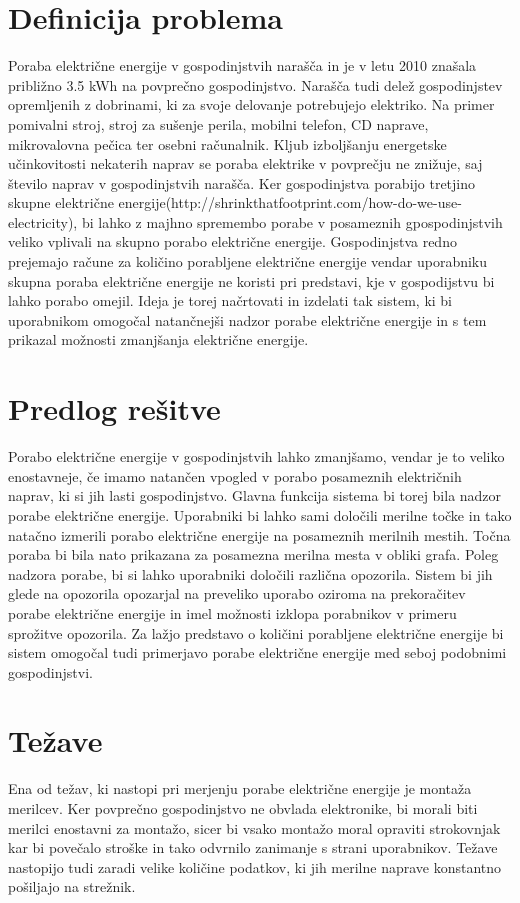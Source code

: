 \documentclass[12pt,a4paper,titlepage,openany]{report}
\begin{document}
\section{Definicija problema}
\thispagestyle{fancy}
Poraba električne energije v gospodinjstvih narašča in je v letu 2010 znašala približno 3.5 kWh na povprečno gospodinjstvo. Narašča tudi delež gospodinjstev opremljenih z dobrinami, ki za svoje delovanje potrebujejo elektriko. Na primer pomivalni stroj, stroj za sušenje perila, mobilni telefon, CD naprave, mikrovalovna pečica ter osebni računalnik. Kljub izboljšanju energetske učinkovitosti nekaterih naprav se poraba elektrike v povprečju ne znižuje, saj število naprav v gospodinjstvih narašča. Ker gospodinjstva porabijo tretjino skupne električne energije(http://shrinkthatfootprint.com/how-do-we-use-electricity), bi lahko z majhno spremembo porabe v posameznih gpospodinjstvih veliko vplivali na skupno porabo električne energije. Gospodinjstva redno prejemajo račune za količino porabljene električne energije vendar uporabniku skupna poraba električne energije ne koristi pri predstavi, kje v gospodijstvu bi lahko porabo omejil. Ideja je torej načrtovati in izdelati tak sistem, ki bi uporabnikom omogočal natančnejši nadzor porabe električne energije in s tem prikazal možnosti zmanjšanja električne energije.

\section{Predlog rešitve}
\thispagestyle{fancy}
Porabo električne energije v gospodinjstvih lahko zmanjšamo, vendar je to veliko enostavneje, če imamo natančen vpogled v porabo posameznih električnih naprav, ki si jih lasti gospodinjstvo. Glavna funkcija sistema bi torej bila nadzor porabe električne energije. Uporabniki bi lahko sami določili merilne točke in tako natačno izmerili porabo električne energije na posameznih merilnih mestih. Točna poraba bi bila nato prikazana za posamezna merilna mesta v obliki grafa. Poleg nadzora porabe, bi si lahko uporabniki določili različna opozorila. Sistem bi jih glede na opozorila opozarjal na preveliko uporabo oziroma na prekoračitev porabe električne energije in imel možnosti izklopa porabnikov v primeru sprožitve opozorila. Za lažjo predstavo o količini porabljene električne energije bi sistem omogočal tudi primerjavo porabe električne energije med seboj podobnimi gospodinjstvi.

\section{Težave}
\thispagestyle{fancy}
Ena od težav, ki nastopi pri merjenju porabe električne energije je montaža merilcev. Ker povprečno gospodinjstvo ne obvlada elektronike, bi morali biti merilci enostavni za montažo, sicer bi vsako montažo moral opraviti strokovnjak kar bi povečalo stroške in tako odvrnilo zanimanje s strani uporabnikov. Težave nastopijo tudi zaradi velike količine podatkov, ki jih merilne naprave konstantno pošiljajo na strežnik. 
\end{document}
